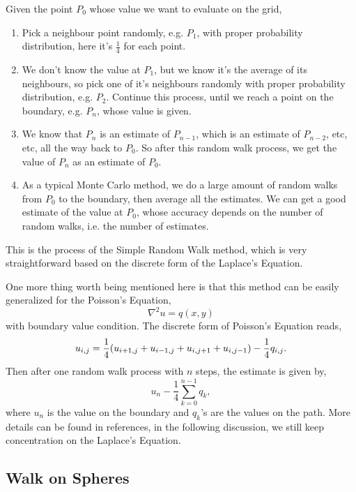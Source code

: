 \documentclass[aps, prl, preprint, groupedaddress]{revtex4-1}
\begin{document}
Given the point $P_0$ whose value we want to evaluate on the grid,
\begin{enumerate}
    \item Pick a neighbour point randomly, e.g. $P_1$, with proper probability distribution, here it's $\frac{1}{4}$ for each point.
    \item We don't know the value at $P_1$, but we know it's the average of its neighbours, so pick one of it's neighbours randomly with proper probability distribution, e.g. $P_2$. Continue this process, until we reach a point on the boundary, e.g. $P_n$, whose value is given.
    \item We know that $P_n$ is an estimate of $P_{n-1}$, which is an estimate of $P_{n-2}$, etc, etc, all the way back to $P_0$. So after this random walk process, we get the value of $P_n$ as an estimate of $P_0$.
    \item As a typical Monte Carlo method, we do a large amount of random walks from $P_0$ to the boundary, then average all the estimates. We can get a good estimate of the value at $P_0$, whose accuracy depends on the number of random walks, i.e. the number of estimates.
\end{enumerate}
This is the process of the Simple Random Walk method, which is very straightforward based on the discrete form of the Laplace's Equation.

One more thing worth being mentioned here is that this method can be easily generalized for the Poisson's Equation,
\begin{equation}
    \nabla^2 u = q(x,y)
\end{equation}
with boundary value condition. The discrete form of Poisson's Equation reads,
\begin{equation}
    u_{i,j} = \frac{1}{4} \qty(u_{i+1,j}+u_{i-1,j}+u_{i,j+1}+u_{i,j-1}) - \frac{1}{4} q_{i,j}.
\end{equation}
Then after one random walk process with $n$ steps, the estimate is given by,
\begin{equation}
    u_n - \frac{1}{4}\sum_{k=0}^{n-1}q_k,
\end{equation}
where $u_n$ is the value on the boundary and $q_k$'s are the values on the path. More details can be found in references, in the following discussion, we still keep concentration on the Laplace's Equation.

\subsection{Walk on Spheres}
\end{document}
